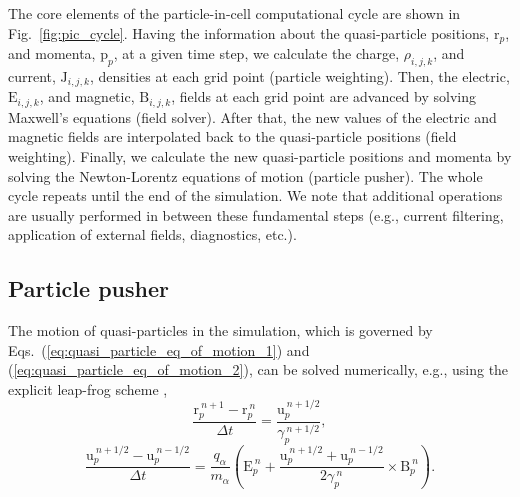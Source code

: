 \documentclass[10pt, a4paper, twoside, openright]{report}
\renewcommand{\vec}[1]{\boldsymbol{\mathrm{#1}}}
\begin{document}

The core elements of the particle-in-cell computational cycle are shown in Fig.~\ref{fig:pic_cycle}. Having the information about the quasi-particle positions, $ \vec{r}_p $, and momenta, $ \vec{p}_p $, at a given time step, we calculate the charge, $ \rho_{i, j, k} $, and current, $ \vec{J}_{i, j, k} $, densities at each grid point (particle weighting). Then, the electric, $ \vec{E}_{i,j,k} $, and magnetic, $ \vec{B}_{i, j, k} $, fields at each grid point are advanced by solving Maxwell's equations (field solver). After that, the new values of the electric and magnetic fields are interpolated back to the quasi-particle positions (field weighting). Finally, we calculate the new quasi-particle positions and momenta by solving the Newton-Lorentz equations of motion (particle pusher). The whole cycle repeats until the end of the simulation. We note that additional operations are usually performed in between these fundamental steps (e.g., current filtering, application of external fields, diagnostics, etc.).


\subsection{Particle pusher}

The motion of quasi-particles in the simulation, which is governed by Eqs.~(\ref{eq:quasi_particle_eq_of_motion_1}) and (\ref{eq:quasi_particle_eq_of_motion_2}), can be solved numerically, e.g., using the explicit leap-frog scheme \cite{Press2007},
\begin{equation}\label{eq:particle_pusher_eq_1}
	\frac{\vec{r}_{p}^{\:n+1} - \vec{r}_{p}^{\:n}}{\Delta t} = \frac{\vec{u}_{p}^{\:n + 1/2}}{\gamma_p^{\:n+1/2}},
\end{equation}
\begin{equation}\label{eq:particle_pusher_eq_2}
	\frac{\vec{u}_{p}^{\:n+1/2} - \vec{u}_{p}^{\:n-1/2}}{\Delta t} = \frac{q_{\alpha}}{m_{\alpha}} \left( \vec{E}_{p}^{\:n} + \frac{\vec{u}_{p}^{\:n+1/2} + \vec{u}_{p}^{\:n-1/2}}{2 \gamma_p^{\:n}} \times \vec{B}_{p}^{\:n} \right).
\end{equation}
\end{document}
